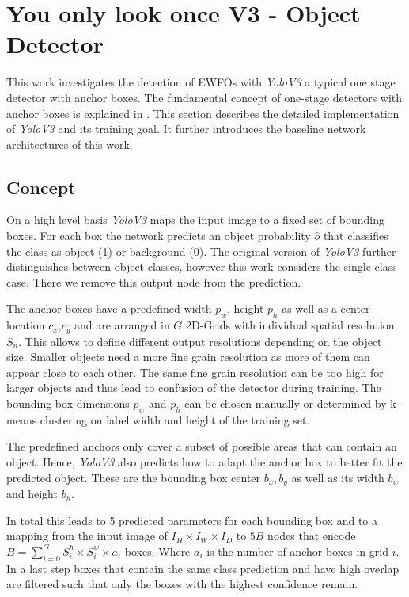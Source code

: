 \section{You only look once V3 - Object Detector}

This work investigates the detection of \acp{EWFO} with \textit{YoloV3} a typical one stage detector with anchor boxes. The fundamental concept of one-stage detectors with anchor boxes is explained in . This section describes the detailed implementation of \textit{YoloV3} and its training goal. It further introduces the baseline network architectures of this work.

\subsection{Concept}

On a high level basis \textit{YoloV3} maps the input image to a fixed set of bounding boxes. For each box the network predicts an object probability $\hat o$ that classifies the class as object (1) or background (0). The original version of \textit{YoloV3} further distinguishes between object classes, however this work considers the single class case. There we remove this output node from the prediction. 

The anchor boxes have a predefined width $p_w$, height $p_h$ as well as a center location $c_x$,$c_y$ and are arranged in $G$ 2D-Grids with individual spatial resolution $S_n$. This allows to define different output resolutions depending on the object size. Smaller objects need a more fine grain resolution as more of them can appear close to each other. The same fine grain resolution can be too high for larger objects and thus lead to confusion of the detector during training. The bounding box dimensions $p_w$ and $p_h$ can be chosen manually or determined by k-means clustering on label width and height of the training set.

The predefined anchors only cover a subset of possible areas that can contain an object. Hence, \textit{YoloV3} also predicts how to adapt the anchor box to better fit the predicted object. These are the bounding box center $b_x,b_y$ as well as its width $b_w$ and height $b_h$. 

In total this leads to 5 predicted parameters for each bounding box and to a mapping from the input image of $I_H\times I_W\times I_D$ to $5B$ nodes that encode $B=\sum_{i=0}^{G}S^h_i\times S^w_i\times a_i$ boxes. Where $a_i$ is the number of anchor boxes in grid $i$. In a last step boxes that contain the same class prediction and have high overlap are filtered such that only the boxes with the highest confidence remain.	

